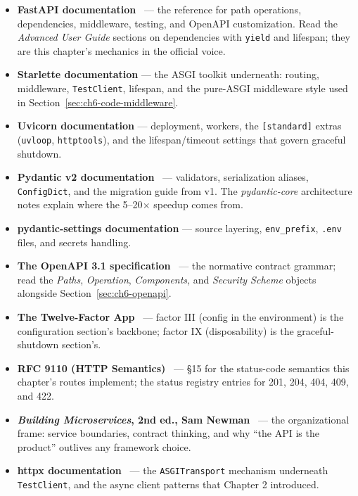 \begin{itemize}[itemsep=0.4em]
  \item \textbf{FastAPI documentation}~\cite{fastapidocs} --- the reference
        for path operations, dependencies, middleware, testing, and OpenAPI
        customization. Read the \emph{Advanced User Guide} sections on
        dependencies with \texttt{yield} and lifespan; they are this
        chapter's mechanics in the official voice.
  \item \textbf{Starlette documentation} --- the ASGI toolkit underneath:
        routing, middleware, \texttt{TestClient}, lifespan, and the
        pure-ASGI middleware style used in
        Section~\ref{sec:ch6-code-middleware}.
  \item \textbf{Uvicorn documentation} --- deployment, workers, the
        \texttt{[standard]} extras (\texttt{uvloop}, \texttt{httptools}),
        and the lifespan/timeout settings that govern graceful shutdown.
  \item \textbf{Pydantic v2 documentation}~\cite{pydanticdocs} ---
        validators, serialization aliases, \texttt{ConfigDict}, and the
        migration guide from v1. The \emph{pydantic-core} architecture notes
        explain where the 5--20$\times$ speedup comes from.
  \item \textbf{pydantic-settings documentation} --- source layering,
        \texttt{env\_prefix}, \texttt{.env} files, and secrets handling.
  \item \textbf{The OpenAPI 3.1 specification}~\cite{openapi31} --- the
        normative contract grammar; read the \emph{Paths}, \emph{Operation},
        \emph{Components}, and \emph{Security Scheme} objects alongside
        Section~\ref{sec:ch6-openapi}.
  \item \textbf{The Twelve-Factor App}~\cite{twelvefactor} --- factor III
        (config in the environment) is the configuration section's backbone;
        factor IX (disposability) is the graceful-shutdown section's.
  \item \textbf{RFC 9110 (HTTP Semantics)}~\cite{rfc9110} --- \S15 for the
        status-code semantics this chapter's routes implement; the status
        registry entries for 201, 204, 404, 409, and 422.
  \item \textbf{\emph{Building Microservices}, 2nd ed., Sam
        Newman}~\cite{newman2021microservices} --- the organizational frame:
        service boundaries, contract thinking, and why ``the API is the
        product'' outlives any framework choice.
  \item \textbf{httpx documentation}~\cite{httpxdocs} --- the
        \texttt{ASGITransport} mechanism underneath \texttt{TestClient}, and
        the async client patterns that Chapter 2 introduced.
\end{itemize}

